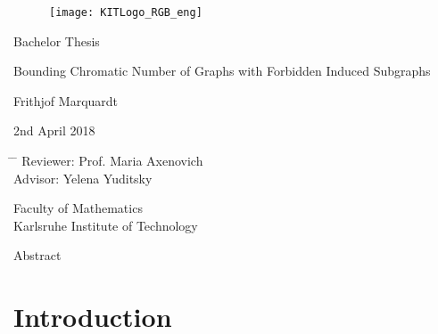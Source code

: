 \documentclass[12pt,a4paper]{scrartcl}
\theoremstyle{plain}
\theoremstyle{definition}
\numberwithin{equation}{section}
\theoremstyle{case}
\begin{document}
  \pagestyle{empty}

  \begin{titlepage}

\begin{figure}[h]
\texttt{[image: KITLogo\_RGB\_eng]} 
\end{figure}
  
    \vspace*{2cm} 

 \begin{center} \large 
    
    Bachelor Thesis
    \vspace*{2cm}

    {\huge Bounding Chromatic Number of Graphs with Forbidden Induced Subgraphs}
    \vspace*{2.5cm}

    Frithjof Marquardt
    \vspace*{1.5cm}

    2nd April 2018
    \vspace*{3cm}
  
    \begin{tabbing}
      \hspace*{10em}\= \hspace*{6em} \= \kill %
      \> Reviewer:\> Prof. Maria Axenovich \\
      \> Advisor:  \> Yelena Yuditsky\\[0.5cm]
    \end{tabbing}
      
    Faculty of Mathematics \\[1cm]
  
		Karlsruhe Institute of Technology
  \end{center}
\end{titlepage}

\begin{center}
Abstract
\end{center}

  \newpage
  \tableofcontents

  \newpage
 


  \pagestyle{headings}

  \section{Introduction}\label{secIntro}
  
  \newpage
  
\end{document}
